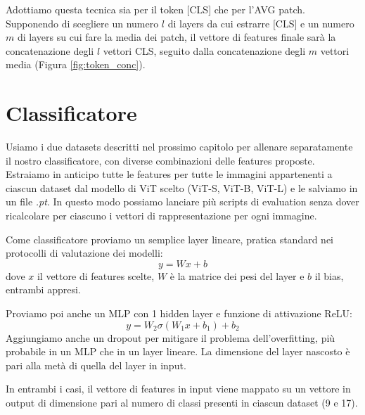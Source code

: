 Adottiamo questa tecnica sia per il token [CLS] che per l'AVG patch. Supponendo di scegliere un numero \(l\) di layers da cui estrarre [CLS] e un numero \(m\) di layers su cui fare la media dei patch, il vettore di features finale sarà la concatenazione degli \(l\) vettori CLS, seguito dalla concatenazione degli \(m\) vettori media (Figura \ref{fig:token_conc}).

\vspace{3mm}
\section{Classificatore}
Usiamo i due datasets descritti nel prossimo capitolo per allenare separatamente il nostro classificatore, con diverse combinazioni delle features proposte. Estraiamo in anticipo tutte le features per tutte le immagini appartenenti a ciascun dataset dal modello di ViT scelto (ViT-S, ViT-B, ViT-L) e le salviamo in un file \textit{.pt}. In questo modo possiamo lanciare più scripts di evaluation senza dover ricalcolare per ciascuno i vettori di rappresentazione per ogni immagine.

Come classificatore proviamo un semplice layer lineare, pratica standard nei protocolli di valutazione dei modelli:
\begin{equation}
    y = Wx + b
\end{equation}
dove \(x\) il vettore di features scelte, \(W\) è la matrice dei pesi del layer e \(b\) il bias, entrambi appresi.

Proviamo poi anche un MLP con 1 hidden layer e funzione di attivazione ReLU:
\begin{equation}
    y = W_2 \sigma(W_1x+b_1)+b_2
\end{equation}
Aggiungiamo anche un dropout per mitigare il problema dell'overfitting, più probabile in un MLP che in un layer lineare. La dimensione del layer nascosto è pari alla metà di quella del layer in input.

In entrambi i casi, il vettore di features in input viene mappato su un vettore in output di dimensione pari al numero di classi presenti in ciascun dataset (9 e 17).

